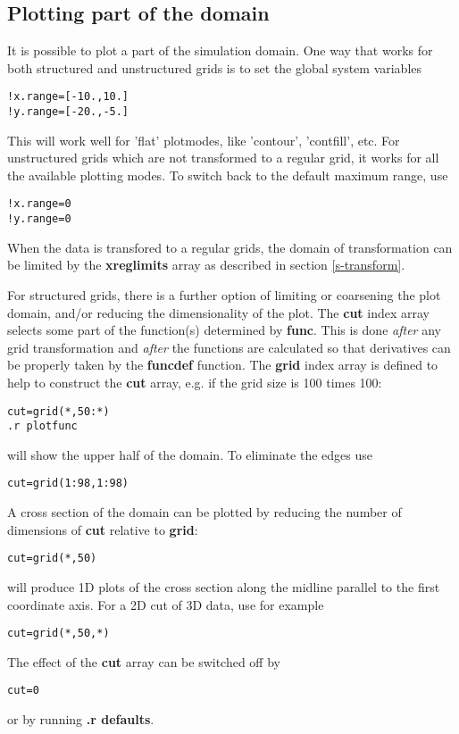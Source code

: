 \subsection{Plotting part of the domain \label{s-plot-part}}

   It is possible to plot a part of the simulation domain.
   One way that works for both structured and unstructured grids is
   to set the global system variables
\begin{verbatim}
!x.range=[-10.,10.]
!y.range=[-20.,-5.]
\end{verbatim}
   This will work well for 'flat' plotmodes, like 'contour',
   'contfill', etc. For unstructured grids which are not transformed
   to a regular grid, it works for all the available plotting modes.
   To switch back to the default maximum range, use
\begin{verbatim}
!x.range=0
!y.range=0
\end{verbatim}
   When the data is transfored to a regular grids, the domain of transformation
   can be limited by the {\bf xreglimits} array as described in section
   \ref{s-transform}. 

   For structured grids, there is a further option of limiting or coarsening
   the plot domain, and/or reducing the dimensionality of the plot.
   The {\bf cut} index array selects some part of the function(s)
   determined by {\bf func}.
   This is done {\em after} any grid transformation and {\em after} 
   the functions are calculated so that derivatives can be properly taken 
   by the {\bf funcdef} function.
   The {\bf grid} index array is defined to help to construct
   the {\bf cut} array, e.g. if the grid size is 100 times 100:
\begin{verbatim}
cut=grid(*,50:*)
.r plotfunc
\end{verbatim}
   will show the upper half of the domain. To eliminate the edges use
\begin{verbatim}
cut=grid(1:98,1:98)
\end{verbatim}
   A cross section of the domain can be plotted by reducing
   the number of dimensions of {\bf cut} relative to {\bf grid}:
\begin{verbatim}
cut=grid(*,50)
\end{verbatim}
   will produce 1D plots of the cross section along the midline parallel to 
   the first coordinate axis. For a 2D cut of 3D data, use for example
\begin{verbatim}
cut=grid(*,50,*)
\end{verbatim}
   The effect of the {\bf cut} array can be switched off by 
\begin{verbatim}
cut=0
\end{verbatim}
   or by running {\bf .r defaults}.

